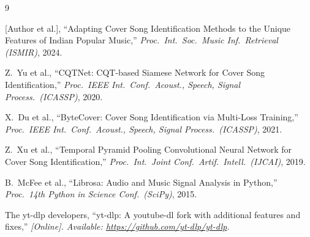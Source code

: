 \documentclass[conference]{IEEEtran}
\begin{document}
\begin{thebibliography}{9}

[Author et al.], ``Adapting Cover Song Identification Methods to the Unique Features of Indian Popular Music,'' \textit{Proc.\ Int.\ Soc.\ Music Inf.\ Retrieval (ISMIR)}, 2024.

Z.\ Yu et al., ``CQTNet: CQT-based Siamese Network for Cover Song Identification,'' \textit{Proc.\ IEEE Int.\ Conf.\ Acoust., Speech, Signal Process.\ (ICASSP)}, 2020.

X.\ Du et al., ``ByteCover: Cover Song Identification via Multi-Loss Training,'' \textit{Proc.\ IEEE Int.\ Conf.\ Acoust., Speech, Signal Process.\ (ICASSP)}, 2021.

Z.\ Xu et al., ``Temporal Pyramid Pooling Convolutional Neural Network for Cover Song Identification,'' \textit{Proc.\ Int.\ Joint Conf.\ Artif.\ Intell.\ (IJCAI)}, 2019.

B.\ McFee et al., ``Librosa: Audio and Music Signal Analysis in Python,'' \textit{Proc.\ 14th Python in Science Conf.\ (SciPy)}, 2015.

The yt-dlp developers, ``yt-dlp: A youtube-dl fork with additional features and fixes,'' \textit{[Online]. Available: \url{https://github.com/yt-dlp/yt-dlp}}.

\end{thebibliography}
\end{document}
